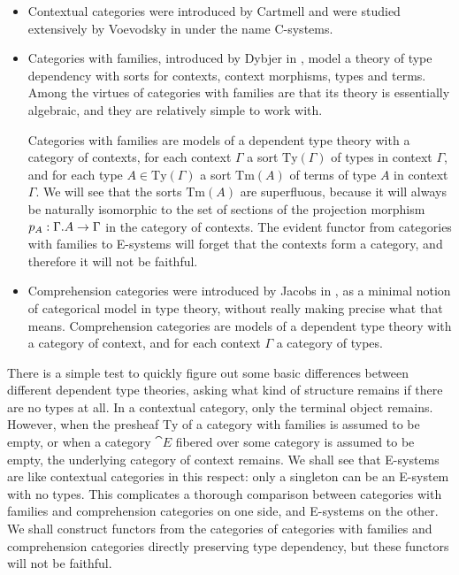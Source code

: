 \begin{itemize}
\item Contextual categories were introduced by Cartmell \cite{Cartmell1986} and were studied
extensively by Voevodsky in \cite{VV_Csys_univ,VV_C-systems_monad,VV_C-systems_quotients}
under the name C-systems.
\item Categories with families, introduced by Dybjer in \cite{Dybjer1996}, model a
theory of type dependency with sorts for contexts, context morphisms, types
and terms. Among the virtues of categories with families are that its theory
is essentially algebraic, and they are relatively simple to work with.

Categories with families are models of a dependent type theory with a
category of contexts, for each context $\Gamma$ a sort $\mathrm{Ty}(\Gamma)$ of
types in context $\Gamma$, and for each type $A\in\mathrm{Ty}(\Gamma)$ a sort
$\mathrm{Tm}(A)$ of terms of type $A$ in context $\Gamma$. We will see that
the sorts $\mathrm{Tm}(A)$ are superfluous, because it will always be 
naturally isomorphic to the set of sections of the projection morphism
$p_A:\ctxext{\Gamma}{A}\to\Gamma$ in the category of contexts. The evident
functor from categories with families to E-systems will forget that the contexts
form a category, and therefore it will not be faithful.
\item Comprehension categories were introduced by Jacobs in \cite{Jacobs1993}, as
a minimal notion of categorical model in type theory, without really making
precise what that means. 
Comprehension categories are models of a dependent type theory with a
category of context, and for each context $\Gamma$ a category of types. 
\end{itemize}

There is a simple test to quickly figure out some basic differences between different
dependent type theories, asking what kind of structure remains if there are no
types at all. In a contextual category, only the terminal object remains.
However, when the presheaf $\mathrm{Ty}$ of a category with families is assumed
to be empty, or when a category $\cat{E}$ fibered over some category is assumed
to be empty, the underlying category of context remains. We shall see that
E-systems are like contextual categories in this respect: only a singleton can
be an E-system with no types. This complicates a thorough comparison between
categories with families and comprehension categories on one side, and E-systems
on the other. We shall construct functors from the categories of categories with
families and comprehension categories directly preserving type dependency, but
these functors will not be faithful. 

